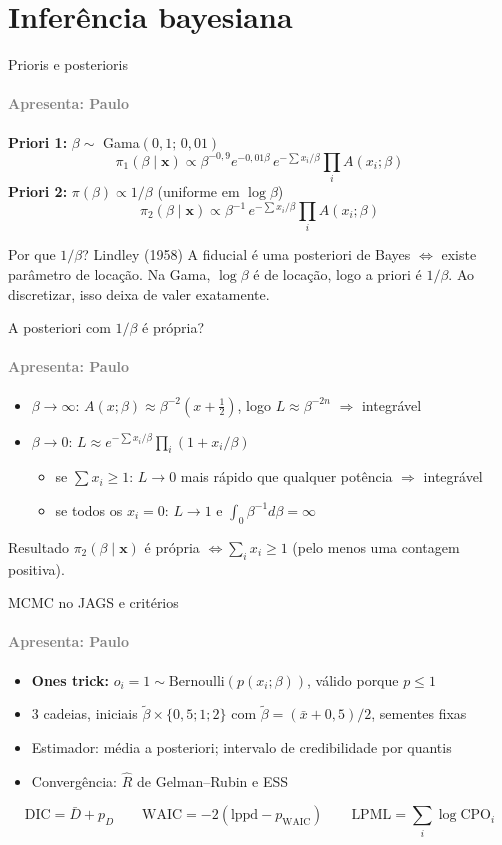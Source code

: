 \documentclass[10pt,aspectratio=169]{beamer}
\newcommand{\por}[1]{\framesubtitle{\textcolor{gray}{Apresenta: #1}}}
\begin{document}
\section{Inferência bayesiana}
\begin{frame}{Prioris e posterioris}
\por{Paulo}
\textbf{Priori 1:} $\beta\sim$ Gama$(0{,}1;\,0{,}01)$
\[
\pi_1(\beta\mid\mathbf x)\propto\beta^{-0{,}9}e^{-0{,}01\beta}\,e^{-\sum x_i/\beta}\prod_iA(x_i;\beta)
\]
\textbf{Priori 2:} $\pi(\beta)\propto1/\beta$ (uniforme em $\log\beta$)
\[
\pi_2(\beta\mid\mathbf x)\propto\beta^{-1}\,e^{-\sum x_i/\beta}\prod_iA(x_i;\beta)
\]
\begin{block}{Por que $1/\beta$? Lindley (1958)}
A fiducial é uma posteriori de Bayes $\iff$ existe parâmetro de locação. Na Gama, $\log\beta$ é de locação, logo a priori é $1/\beta$. Ao discretizar, isso deixa de valer exatamente.
\end{block}
\end{frame}

\begin{frame}{A posteriori com $1/\beta$ é própria?}
\por{Paulo}
\begin{itemize}
\item $\beta\to\infty$: $A(x;\beta)\approx\beta^{-2}(x+\tfrac12)$, logo $L\approx\beta^{-2n}$ \quad $\Rightarrow$ \quad integrável
\item $\beta\to0$: $L\approx e^{-\sum x_i/\beta}\prod_i(1+x_i/\beta)$
  \begin{itemize}
  \item se $\sum x_i\ge1$: $L\to0$ mais rápido que qualquer potência \quad $\Rightarrow$ \quad integrável
  \item se todos os $x_i=0$: $L\to1$ e $\int_0\beta^{-1}d\beta=\infty$
  \end{itemize}
\end{itemize}
\begin{block}{Resultado}
$\pi_2(\beta\mid\mathbf x)$ é própria $\iff\sum_ix_i\ge1$ (pelo menos uma contagem positiva).
\end{block}
\end{frame}

\begin{frame}{MCMC no JAGS e critérios}
\por{Paulo}
\begin{itemize}
\item \textbf{Ones trick:} $o_i=1\sim\text{Bernoulli}(p(x_i;\beta))$, válido porque $p\le1$
\item 3 cadeias, iniciais $\tilde\beta\times\{0{,}5;1;2\}$ com $\tilde\beta=(\bar x+0{,}5)/2$, sementes fixas
\item Estimador: média a posteriori; intervalo de credibilidade por quantis
\item Convergência: $\hat R$ de Gelman--Rubin e ESS
\end{itemize}
\[
\text{DIC}=\bar D+p_D \qquad \text{WAIC}=-2(\text{lppd}-p_{\text{WAIC}}) \qquad \text{LPML}=\sum_i\log\text{CPO}_i
\]
\end{frame}
\end{document}
